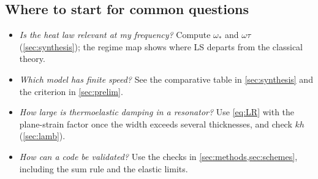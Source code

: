\subsection{Where to start for common questions}
\begin{itemize}
\item \emph{Is the heat law relevant at my frequency?} Compute $\omega_*$ and $\omega\tau$ (\cref{sec:synthesis}); the regime map shows where LS departs from the classical theory.
\item \emph{Which model has finite speed?} See the comparative table in \cref{sec:synthesis} and the criterion in \cref{sec:prelim}.
\item \emph{How large is thermoelastic damping in a resonator?} Use \cref{eq:LR} with the plane-strain factor once the width exceeds several thicknesses, and check $kh$ (\cref{sec:lamb}).
\item \emph{How can a code be validated?} Use the checks in \cref{sec:methods,sec:schemes}, including the sum rule and the elastic limits.
\end{itemize}
